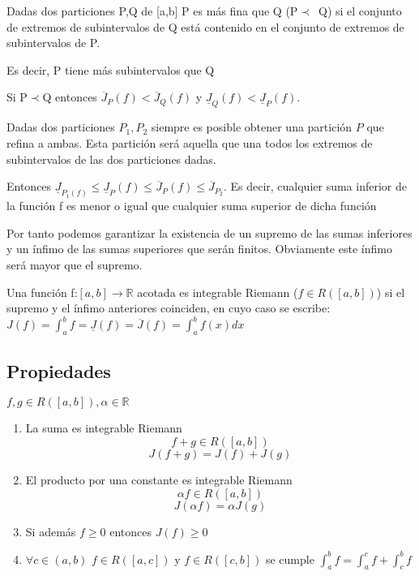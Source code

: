 \documentclass{apuntes}
\begin{document}
\begin{defn}[Finura]
Dadas dos particiones P,Q de [a,b] P es más fina que Q (P$\prec$~Q) si el conjunto de extremos de subintervalos de Q está contenido en el conjunto de extremos de subintervalos de P.

Es decir, P tiene más subintervalos que Q
\end{defn}

Si P$\prec$Q entonces $\overline{J}_P(f) < \overline{J}_Q(f)$  y $\underline{J}_Q(f) < \underline{J}_P(f)$.

Dadas dos particiones $P_1,P_2$ siempre es posible obtener una partición $P$ que refina a ambas. Esta partición será aquella que una todos los extremos de subintervalos de las dos particiones dadas.

Entonces $\underline{J}_{P_1(f)} \leq \underline{J}_P(f) \leq \overline{J}_P(f) \leq \overline{J}_{P_2}$. Es decir, cualquier suma inferior de la función f es menor o igual que cualquier suma superior de dicha función

Por tanto podemos garantizar la existencia de un supremo de las sumas inferiores y un ínfimo de las sumas superiores que serán finitos. Obviamente este ínfimo será mayor que el supremo.

\begin{defn}
Una función f:$[ a,b] \rightarrow \mathbb{R}$ acotada es integrable Riemann ($f \in R([a,b])$) si el supremo y el ínfimo anteriores coinciden, en cuyo caso se escribe:
$J(f) = \int_a^b f = \underline{J}(f) = \overline{J}(f) = \int_a^b f(x) dx$
\end{defn}

\subsection{Propiedades}
$f,g \in R([a,b]), \alpha \in \mathbb{R}$
\begin{enumerate}
\item La suma es integrable Riemann
\[f + g \in R([a,b])\]\[ J(f+g) = J(f) + J(g)\]
\item El producto por una constante es integrable Riemann
\[\alpha f \in R([a,b])\] \[ J(\alpha f) = \alpha J(g)\]
\item Si además $f\geq 0$ entonces $J(f)\geq 0$
\item $\forall c \in (a,b)$ $f\in R([a,c])$  y $f\in R([c,b])$ se cumple
$\int_a^b f = \int_a^c f + \int_c^b f$
\end{enumerate}
\end{document}
